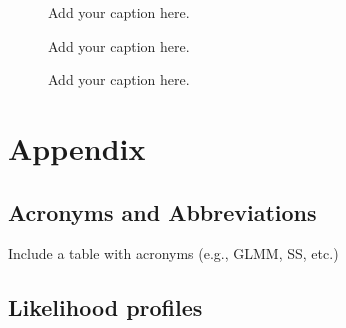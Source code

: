 \documentclass[
]{scrartcl}
\begin{document}
\newpage{}

\begin{figure}


\caption{\label{fig-ts-cpue}Add your caption here.}

\end{figure}%

\newpage{}

\begin{figure}


\caption{\label{fig-ts-ps-cpue}Add your caption here.}

\end{figure}%

\newpage{}

\begin{figure}


\caption{\label{fig-comp-cpue}Add your caption here.}

\end{figure}%

\newpage{}

\section{Appendix}\label{appendix}

\subsection{Acronyms and
Abbreviations}\label{acronyms-and-abbreviations}

Include a table with acronyms (e.g., GLMM, SS, etc.)

\subsection{Likelihood profiles}\label{likelihood-profiles}
\end{document}
